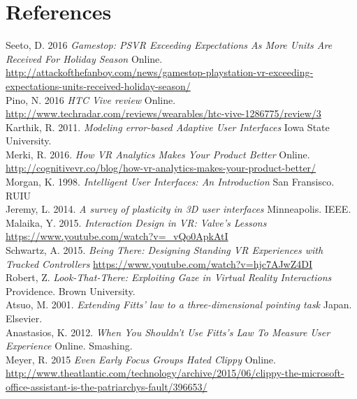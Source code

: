 \documentclass[11pt]{article}
\begin{document}
\section{References}

Seeto, D. 2016 \emph{Gamestop: PSVR Exceeding Expectations As More Units Are Received For Holiday Season} Online. \url{http://attackofthefanboy.com/news/gamestop-playstation-vr-exceeding-expectations-units-received-holiday-season/} \\

Pino, N. 2016 \emph{HTC Vive review} Online. \url{http://www.techradar.com/reviews/wearables/htc-vive-1286775/review/3} \\

Karthik, R. 2011. \emph{Modeling error-based Adaptive User Interfaces} Iowa State University. \\

Merki, R. 2016. \emph{How VR Analytics Makes Your Product Better} Online. \url{http://cognitivevr.co/blog/how-vr-analytics-makes-your-product-better/} \\

Morgan, K. 1998. \emph{Intelligent User
Interfaces: An Introduction} San Fransisco. RUIU \\

Jeremy, L. 2014. \emph{A survey of plasticity in 3D user interfaces} Minneapolis. IEEE. \\

Malaika, Y. 2015. \emph{Interaction Design in VR: Valve's Lessons
} \url{https://www.youtube.com/watch?v=_vQo0ApkAtI} \\

Schwartz, A. 2015. \emph{Being There: Designing Standing VR Experiences with Tracked Controllers} \url{https://www.youtube.com/watch?v=hjc7AJwZ4DI
} \\

Robert, Z. \emph{Look-That-There: Exploiting Gaze in Virtual Reality Interactions} Providence. Brown University. \\

Atsuo, M. 2001. \emph{Extending Fitts' law to a three-dimensional pointing task} Japan. Elsevier. \\

Anastasios, K. 2012. \emph{When You Shouldn't Use Fitts's Law To Measure User Experience} Online. Smashing. \\

Meyer, R. 2015 \emph{Even Early Focus Groups Hated Clippy} Online. \url{http://www.theatlantic.com/technology/archive/2015/06/clippy-the-microsoft-office-assistant-is-the-patriarchys-fault/396653/} \\
\end{document}
